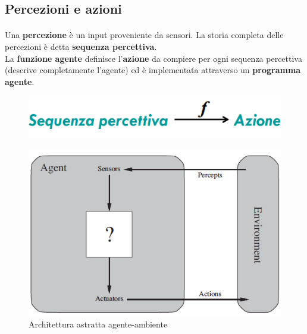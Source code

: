 \documentclass[a4paper, 12pt]{report}
\begin{document}
            \subsection{Percezioni e azioni}
                \paragraph{} Una \textbf{percezione} è un input proveniente da sensori. La storia completa delle percezioni è detta \textbf{sequenza percettiva}.\\
                La \textbf{funzione agente} definisce l'\textbf{azione} da compiere per ogni sequenza percettiva (descrive completamente l'agente) ed è implementata attraverso un \textbf{programma agente}.
                \begin{figure}[htbp]
                    \centering
                    \includegraphics[scale=0.5]{Media/FunzioneAgente.png}
                \end{figure}
                \begin{figure}[htbp]
                    \centering
                    \includegraphics[scale=0.5]{Media/ArchitetturaAstrattaAgenteAmbiente.png}
                    \caption{Architettura astratta agente-ambiente}
                \end{figure}
\end{document}
